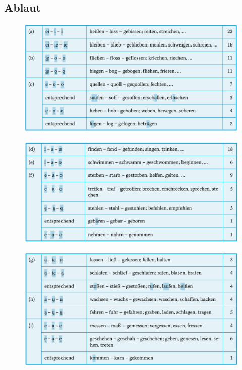 \documentclass[UTF8]{report}
\begin{document}
\subsection{Ablaut}
\begin{figure}[H]
    \centering
    \includegraphics[scale=0.7]{Abl.png}
\end{figure}
\begin{figure}[H]
    \centering
    \includegraphics[scale=0.7]{Abl1.png}
\end{figure}
\begin{figure}[H]
    \centering
    \includegraphics[scale=0.7]{Abl2.png}
\end{figure}
\end{document}
